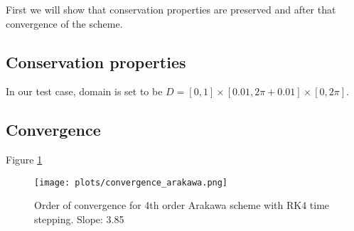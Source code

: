 First we will show that conservation properties are preserved and after that convergence of the scheme.

\subsection{Conservation properties}
In our test case, domain is set to be $D=[0,1]\times[0.01,2\pi+0.01]\times[0,2\pi]$.

\subsection{Convergence}
Figure \ref{fig:akw_conv}
\begin{figure}[h]
\begin{center}
    \texttt{[image: plots/convergence\_arakawa.png]}
\end{center}
\caption{Order of convergence for 4th order Arakawa scheme with RK4 time stepping. Slope: 3.85}
\label{fig:akw_conv}
\end{figure}